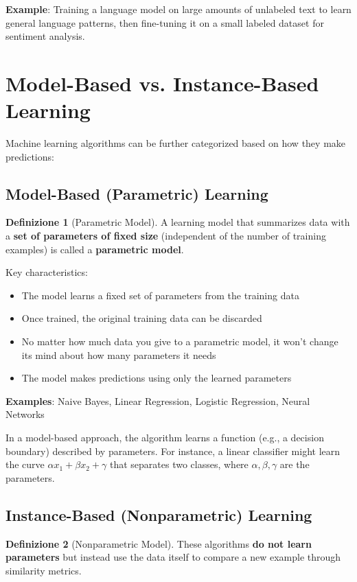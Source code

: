 \documentclass[11pt,a4paper]{article}
\theoremstyle{definition}
\newtheorem{definition}{Definizione}[section]
\theoremstyle{plain}
\theoremstyle{remark}
\begin{document}
\textbf{Example}: Training a language model on large amounts of unlabeled text to learn general language patterns, then fine-tuning it on a small labeled dataset for sentiment analysis.

\section{Model-Based vs. Instance-Based Learning}

Machine learning algorithms can be further categorized based on how they make predictions:

\subsection{Model-Based (Parametric) Learning}

\begin{definition}[Parametric Model]
A learning model that summarizes data with a \textbf{set of parameters of fixed size} (independent of the number of training examples) is called a \textbf{parametric model}.
\end{definition}

Key characteristics:
\begin{itemize}
    \item The model learns a fixed set of parameters from the training data
    \item Once trained, the original training data can be discarded
    \item No matter how much data you give to a parametric model, it won't change its mind about how many parameters it needs
    \item The model makes predictions using only the learned parameters
\end{itemize}

\textbf{Examples}: Naive Bayes, Linear Regression, Logistic Regression, Neural Networks

In a model-based approach, the algorithm learns a function (e.g., a decision boundary) described by parameters. For instance, a linear classifier might learn the curve $\alpha x_1 + \beta x_2 + \gamma$ that separates two classes, where $\alpha, \beta, \gamma$ are the parameters.

\subsection{Instance-Based (Nonparametric) Learning}

\begin{definition}[Nonparametric Model]
These algorithms \textbf{do not learn parameters} but instead use the data itself to compare a new example through similarity metrics.
\end{definition}
\end{document}
